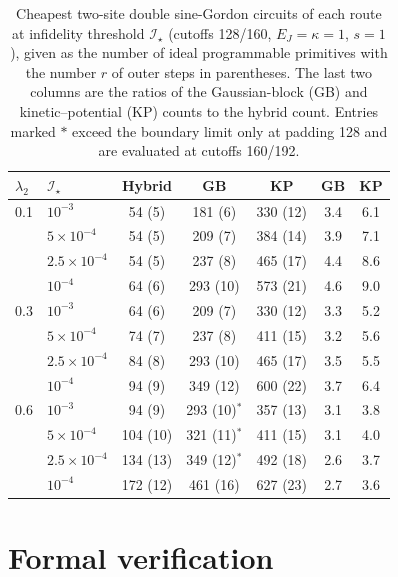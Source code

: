 \documentclass[pra,twocolumn,superscriptaddress,nofootinbib,floatfix]{revtex4-2}
\theoremstyle{remark}
\begin{document}
\begin{table}[t]
\caption{Cheapest two-site double sine-Gordon circuits of each route at infidelity threshold \(\mathcal I_\star\) (cutoffs 128/160, \(E_J=\kappa=1\), \(s=1\)), given as the number of ideal programmable primitives with the number \(r\) of outer steps in parentheses. The last two columns are the ratios of the Gaussian-block (GB) and kinetic--potential (KP) counts to the hybrid count. Entries marked \(\ast\) exceed the boundary limit only at padding 128 and are evaluated at cutoffs 160/192.}
\label{tab:dsg-thresholds}
\begin{ruledtabular}
\begin{tabular}{llccccc}
\(\lambda_2\) & \(\mathcal I_\star\) & Hybrid & GB & KP & GB & KP \\
\hline
0.1 & \(10^{-3}\) & 54 (5) & 181 (6) & 330 (12) & 3.4 & 6.1 \\
  & \(5\times10^{-4}\) & 54 (5) & 209 (7) & 384 (14) & 3.9 & 7.1 \\
  & \(2.5\times10^{-4}\) & 54 (5) & 237 (8) & 465 (17) & 4.4 & 8.6 \\
  & \(10^{-4}\) & 64 (6) & 293 (10) & 573 (21) & 4.6 & 9.0 \\
0.3 & \(10^{-3}\) & 64 (6) & 209 (7) & 330 (12) & 3.3 & 5.2 \\
  & \(5\times10^{-4}\) & 74 (7) & 237 (8) & 411 (15) & 3.2 & 5.6 \\
  & \(2.5\times10^{-4}\) & 84 (8) & 293 (10) & 465 (17) & 3.5 & 5.5 \\
  & \(10^{-4}\) & 94 (9) & 349 (12) & 600 (22) & 3.7 & 6.4 \\
0.6 & \(10^{-3}\) & 94 (9) & 293 (10)\(^\ast\) & 357 (13) & 3.1 & 3.8 \\
  & \(5\times10^{-4}\) & 104 (10) & 321 (11)\(^\ast\) & 411 (15) & 3.1 & 4.0 \\
  & \(2.5\times10^{-4}\) & 134 (13) & 349 (12)\(^\ast\) & 492 (18) & 2.6 & 3.7 \\
  & \(10^{-4}\) & 172 (12) & 461 (16) & 627 (23) & 2.7 & 3.6 \\
\end{tabular}
\end{ruledtabular}
\end{table}

\section{Formal verification}
\label{app:lean}
\end{document}
